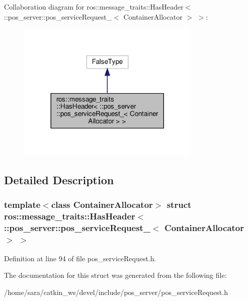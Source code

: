 Collaboration diagram for ros\+:\+:message\+\_\+traits\+:\+:Has\+Header$<$ \+:\+:pos\+\_\+server\+:\+:pos\+\_\+service\+Request\+\_\+$<$ Container\+Allocator $>$ $>$\+:
\nopagebreak
\begin{figure}[H]
\begin{center}
\leavevmode
\includegraphics[width=248pt]{structros_1_1message__traits_1_1HasHeader_3_01_1_1pos__server_1_1pos__serviceRequest___3_01Contac7754d8dcd729c94ef71e364c700bb5f}
\end{center}
\end{figure}


\subsection{Detailed Description}
\subsubsection*{template$<$class Container\+Allocator$>$\newline
struct ros\+::message\+\_\+traits\+::\+Has\+Header$<$ \+::pos\+\_\+server\+::pos\+\_\+service\+Request\+\_\+$<$ Container\+Allocator $>$ $>$}



Definition at line 94 of file pos\+\_\+service\+Request.\+h.



The documentation for this struct was generated from the following file\+:\begin{DoxyCompactItemize}
\item 
/home/sara/catkin\+\_\+ws/devel/include/pos\+\_\+server/pos\+\_\+service\+Request.\+h\end{DoxyCompactItemize}

